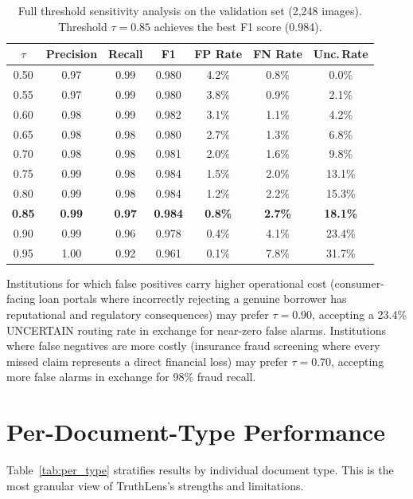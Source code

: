 \documentclass[12pt,a4paper,oneside]{report}
\begin{document}
\begin{table}[H]
\centering
\caption{Full threshold sensitivity analysis on the validation set (2,248 images).
Threshold $\tau = 0.85$ achieves the best F1 score (0.984).}
\label{tab:thresh_sensitivity}
\renewcommand{\arraystretch}{1.25}
\begin{tabular}{ccccccc}
\toprule
\textbf{$\tau$} & \textbf{Precision} & \textbf{Recall} & \textbf{F1} &
\textbf{FP Rate} & \textbf{FN Rate} & \textbf{Unc.\,Rate} \\
\midrule
0.50 & 0.97 & 0.99 & 0.980 & 4.2\% & 0.8\% & 0.0\% \\
0.55 & 0.97 & 0.99 & 0.980 & 3.8\% & 0.9\% & 2.1\% \\
0.60 & 0.98 & 0.99 & 0.982 & 3.1\% & 1.1\% & 4.2\% \\
0.65 & 0.98 & 0.98 & 0.980 & 2.7\% & 1.3\% & 6.8\% \\
0.70 & 0.98 & 0.98 & 0.981 & 2.0\% & 1.6\% & 9.8\% \\
0.75 & 0.99 & 0.98 & 0.984 & 1.5\% & 2.0\% & 13.1\% \\
0.80 & 0.99 & 0.98 & 0.984 & 1.2\% & 2.2\% & 15.3\% \\
\textbf{0.85} & \textbf{0.99} & \textbf{0.97} & \textbf{0.984} & \textbf{0.8\%} & \textbf{2.7\%} & \textbf{18.1\%} \\
0.90 & 0.99 & 0.96 & 0.978 & 0.4\% & 4.1\% & 23.4\% \\
0.95 & 1.00 & 0.92 & 0.961 & 0.1\% & 7.8\% & 31.7\% \\
\bottomrule
\end{tabular}
\end{table}

Institutions for which false positives carry higher operational cost (consumer-facing
loan portals where incorrectly rejecting a genuine borrower has reputational and
regulatory consequences) may prefer $\tau = 0.90$, accepting a 23.4\% UNCERTAIN
routing rate in exchange for near-zero false alarms. Institutions where false
negatives are more costly (insurance fraud screening where every missed claim
represents a direct financial loss) may prefer $\tau = 0.70$, accepting more
false alarms in exchange for 98\% fraud recall.

\section{Per-Document-Type Performance}
\label{sec:per_type}

Table~\ref{tab:per_type} stratifies results by individual document type.
This is the most granular view of TruthLens's strengths and limitations.
\end{document}
